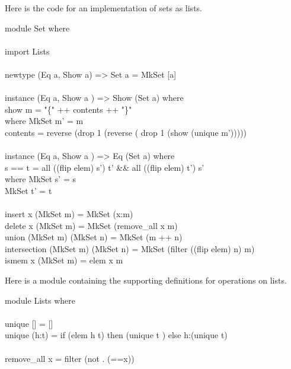 \documentclass[11pt]{article}
\begin{document}



Here is the code for an implementation of sets as lists.

\begin{program*}
\> module Set where                \\
\>                 \\
\> import Lists                \\
\>                 \\
\> newtype (Eq a, Show a) => Set a = MkSet [a]                \\
\>                 \\
\> instance (Eq a, Show a ) => Show (Set a) where                \\
\>    show m = "\{" ++ contents ++ "\}"                 \\
\>      where MkSet m' = m                \\
\>            contents = reverse (drop 1 (reverse ( drop 1 (show (unique m')))))                \\
\>                 \\
\> instance (Eq a, Show a ) => Eq (Set a) where                \\
\>     s == t = all ((flip elem) s') t' \&\&  all ((flip elem) t') s'                 \\
\>                where MkSet s' = s                \\
\>                      MkSet t' = t                \\
\>                 \\
\> insert x (MkSet m) = MkSet (x:m)                \\
\> delete x (MkSet m) = MkSet (remove\_all x m)                \\
\> union (MkSet m) (MkSet n) = MkSet (m ++ n)                \\
\> intersection (MkSet m) (MkSet n) = MkSet (filter ((flip elem) n) m)                \\
\> ismem x (MkSet m) = elem x m                \\
\end{program*}

Here is a module containing the supporting definitions for operations on lists.

\begin{program*}
\> module Lists where                \\
\>  \\
\> unique [] = []                \\
\> unique (h:t) = if (elem h t) then (unique t ) else h:(unique t)                \\
\>                 \\
\> remove\_all x = filter (not . (==x))                \\
\end{program*}
\end{document}

